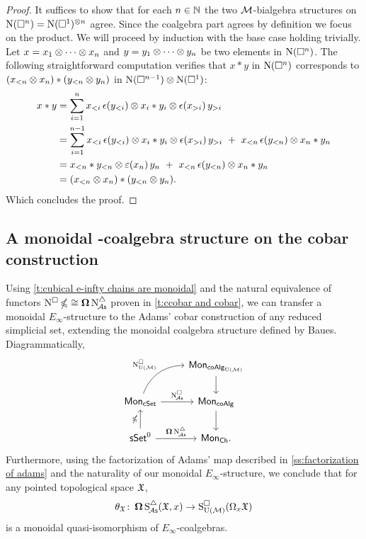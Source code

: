 \begin{proof}
	It suffices to show that for each $n \in \mathbb{N}$ the two $\mathcal{M}$-bialgebra structures on $\operatorname{N}(\square^n) = \operatorname{N}(\square^1)^{\otimes n}$ agree.
	Since the coalgebra part agrees by definition we focus on the product.
	We will proceed by induction with the base case holding trivially.
	Let $x = x_1 \otimes \dotsb \otimes x_n$ and $y = y_1 \otimes \dotsb \otimes y_n$ be two elements in $\operatorname{N}(\square^n)$.
	The following straightforward computation verifies that $x \ast y$ in $\operatorname{N}(\square^n)$ corresponds to $(x_{<n} \otimes x_n) \ast (y_{<n} \otimes y_n)$ in $\operatorname{N}(\square^{n-1}) \otimes \operatorname{N}(\square^1)$:
	\begin{align*}
		x \ast y &=
		\sum_{i=1}^n x_{<i}\, \epsilon(y_{<i}) \otimes x_i \ast y_i \otimes \epsilon(x_{>i}) \, y_{>i} \\ &=
		\sum_{i=1}^{n-1} x_{<i}\, \epsilon(y_{<i}) \otimes x_i \ast y_i \otimes \epsilon(x_{>i}) \, y_{>i} \ +\
		x_{<n}\, \epsilon(y_{<n}) \otimes x_n \ast y_n \\ &=
		x_{<n} \ast y_{<n} \otimes \operatorname{\varepsilon}(x_n)\, y_n \ +\ x_{<n}\, \epsilon(y_{<n}) \otimes x_n \ast y_n \\ &=
		(x_{<n} \otimes x_n) \ast (y_{<n} \otimes y_n).
	\end{align*}
	Which concludes the proof.
\end{proof}

\subsection{A monoidal \pdfEinfty-coalgebra structure on the cobar construction}\label{ss:e-infty on cobar}


Using \cref{t:cubical e-infty chains are monoidal} and the natural equivalence of functors $\operatorname{N^{\square}} \operatorname{\mathbb{\Omega}} \cong \operatorname{\mathbf{\Omega}} \operatorname{N^{\triangle}_{\!{\mathcal{A}\mathsf{s}}}}$ proven in \cref{t:ccobar and cobar}, we can transfer a monoidal $E_\infty$-structure to the Adams' cobar construction of any reduced simplicial set, extending the monoidal coalgebra structure defined by Baues.
Diagrammatically,
\[
\begin{tikzcd}
	& \Mon_{\coAlg_\UM} \arrow[d] \\
	\Mon_{\cSet} \arrow[ru, "\cchainsUM", out=70, in=180] \arrow[r, "\cchainsA"]
	& \Mon_{\coAlg} \arrow[d] \\
	\sSet^0 \arrow[r, "\cobar \schainsA"] \arrow[u, "\ccobar"]
	& \Mon_{\Ch}.
\end{tikzcd}
\]
Furthermore, using the factorization of Adams' map described in \cref{ss:factorization of adams} and the naturality of our monoidal $E_\infty$-structure, we conclude that for any pointed topological space $\mathfrak{X}$,
\[
\theta_{\mathfrak{X}} \colon \operatorname{\mathbf{\Omega}} \operatorname{S^{\triangle}_{\!{\mathcal{A}\mathsf{s}}}}(\mathfrak{X},x) \to \operatorname{S^{\square}_{{\operatorname{U}(\mathcal{M})}}}(\Omega_x \mathfrak{X})
\]
is a monoidal quasi-isomorphism of $E_{\infty}$-coalgebras.


